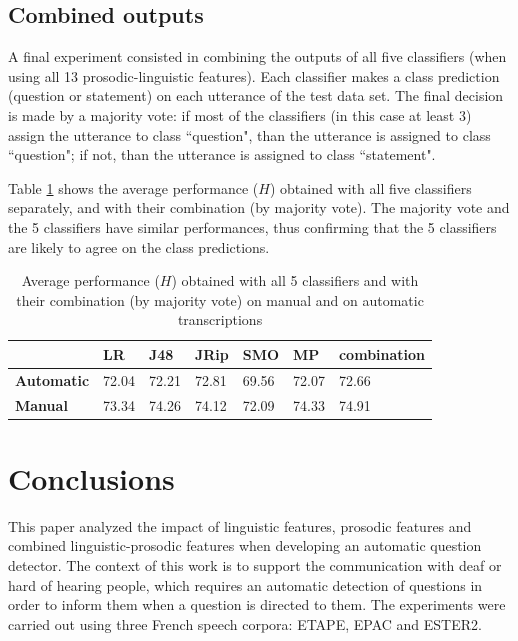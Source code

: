 \documentclass[runningheads,a4paper]{llncs}
\begin{document}
\subsection{Combined outputs}

A final experiment consisted in combining the outputs of all five classifiers (when using all 13 prosodic-linguistic features).
Each classifier makes a class prediction (question or statement) on each utterance of the test data set.
The final decision is made by a majority vote: if most of the classifiers (in this case at least 3) assign the utterance to class ``question", than the utterance is assigned to class ``question"; if not, than the utterance is assigned to class ``statement".

Table \ref{Tab:mixC} shows the average performance ($H$) obtained with all five classifiers separately, and with their combination (by majority vote).
The majority vote and the 5 classifiers have similar performances, thus confirming that the 5 classifiers are likely to agree on the class predictions.

\begin{table}
\renewcommand{\arraystretch}{1.3}
\caption{Average performance ($H$) obtained with all 5 classifiers and with their combination (by majority vote) on manual and on automatic transcriptions}
\label{Tab:mixC}
\centering
\begin{tabular}{|p{2cm}|p{1.2cm}|p{1.2cm}|p{1.2cm}|p{1.2cm}|p{1.2cm}|p{2cm}|}
\cline{2-7}
\multicolumn{1}{c|}{}	& LR		& J48		& JRip		& SMO		& MP		& combination 	\\ \hline
\textbf{Automatic}  	& 72.04  	& 72.21		& 72.81		& 69.56		& 72.07		& 72.66		\\ \hline
\textbf{Manual} 	& 73.34 	& 74.26		& 74.12		& 72.09		& 74.33		& 74.91		\\ \hline
\end{tabular}
\end{table}



\section{Conclusions}

This paper analyzed the impact of linguistic features, prosodic features and combined linguistic-prosodic features when developing an automatic question detector.
The context of this work is to support the communication with deaf or hard of hearing people, which requires an automatic detection of questions in order to inform them when a question is directed to them. The experiments were carried out using three French speech corpora: ETAPE, EPAC and ESTER2.
\end{document}

